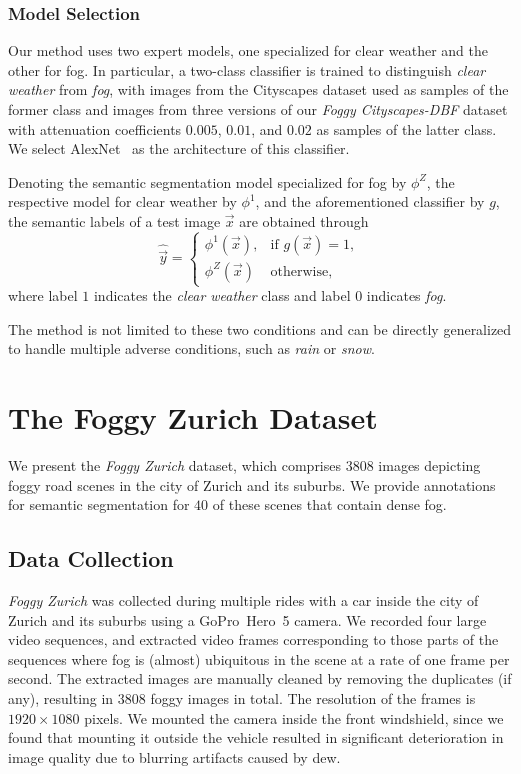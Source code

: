 \documentclass[twocolumn]{svjour3}          \smartqed  \usepackage{graphicx}
\begin{document}
\subsubsection{Model Selection} 
\label{sec:model:selection} 
Our method uses two expert models, one specialized for clear weather and the other for fog. In particular, a two-class classifier is trained to distinguish \emph{clear weather} from \emph{fog}, with images from the Cityscapes dataset used as samples of the former class and images from three versions of our \emph{Foggy Cityscapes-DBF} dataset with attenuation coefficients $0.005$, $0.01$, and $0.02$ as samples of the latter class. We select AlexNet~\cite{alexnet} as the architecture of this classifier.

Denoting the semantic segmentation model specialized for fog by $\phi^Z$, the respective model for clear weather by $\phi^1$, and the aforementioned classifier by $g$, the semantic labels of a test image $\vec{x}$ are obtained through
\begin{equation}
    \hat{\vec{y}} = \begin{cases}
     \phi^1(\vec{x}), & \text{if $g(\vec{x})=1$},\\
     \phi^Z(\vec{x}) & \text{otherwise,}
  \end{cases}
\end{equation}
where label $1$ indicates the \emph{clear weather} class and label $0$ indicates \emph{fog}.  

The method is not limited to these two conditions and can be directly generalized to handle multiple adverse conditions, such as \emph{rain} or \emph{snow}.


\section{The Foggy Zurich Dataset}
\label{sec:dataset}

We present the \emph{Foggy Zurich} dataset, which comprises $3808$ images depicting foggy road scenes in the city of Zurich and its suburbs. We provide annotations for semantic segmentation for $40$ of these scenes that contain dense fog.

\subsection{Data Collection}

\emph{Foggy Zurich} was collected during multiple rides with a car inside the city of Zurich and its suburbs using a GoPro~Hero~5 camera. We recorded four large video sequences, and extracted video frames corresponding to those parts of the sequences where fog is (almost) ubiquitous in the scene at a rate of one frame per second. The extracted images are manually cleaned by removing the duplicates (if any), resulting in $3808$ foggy images in total. The resolution of the frames is $1920 \times 1080$ pixels. We mounted the camera inside the front windshield, since we found that mounting it outside the vehicle resulted in significant deterioration in image quality due to blurring artifacts caused by dew.
\end{document}
